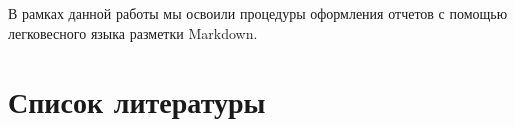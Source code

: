 \documentclass[
  english,
  russian,
  12pt,
  a4paper,
  DIV=11,
  numbers=noendperiod]{scrreprt}
\begin{document}
В рамках данной работы мы освоили процедуры оформления отчетов с помощью
легковесного языка разметки Markdown.

\chapter*{Список
литературы}\label{ux441ux43fux438ux441ux43eux43a-ux43bux438ux442ux435ux440ux430ux442ux443ux440ux44b}

\printbibliography[heading=none]
\end{document}
